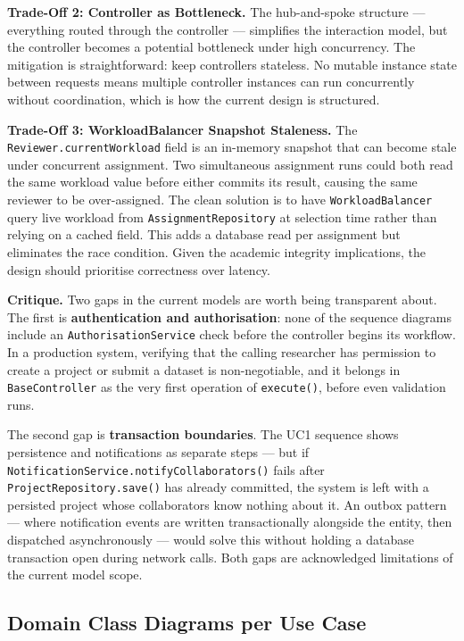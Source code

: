 \documentclass[12pt,a4paper]{article}
\newcommand{\code}[1]{\texttt{\small #1}}
\begin{document}
\noindent\textbf{Trade-Off 2: Controller as Bottleneck.}
The hub-and-spoke structure --- everything routed through the controller --- simplifies the interaction model, but the controller becomes a potential bottleneck under high concurrency. The mitigation is straightforward: keep controllers stateless. No mutable instance state between requests means multiple controller instances can run concurrently without coordination, which is how the current design is structured.

\noindent\textbf{Trade-Off 3: WorkloadBalancer Snapshot Staleness.}
The \code{Reviewer.currentWorkload} field is an in-memory snapshot that can become stale under concurrent assignment. Two simultaneous assignment runs could both read the same workload value before either commits its result, causing the same reviewer to be over-assigned. The clean solution is to have \code{WorkloadBalancer} query live workload from \code{AssignmentRepository} at selection time rather than relying on a cached field. This adds a database read per assignment but eliminates the race condition. Given the academic integrity implications, the design should prioritise correctness over latency.

\noindent\textbf{Critique.}
Two gaps in the current models are worth being transparent about. The first is \textbf{authentication and authorisation}: none of the sequence diagrams include an \code{AuthorisationService} check before the controller begins its workflow. In a production system, verifying that the calling researcher has permission to create a project or submit a dataset is non-negotiable, and it belongs in \code{BaseController} as the very first operation of \code{execute()}, before even validation runs.

The second gap is \textbf{transaction boundaries}. The UC1 sequence shows persistence and notifications as separate steps --- but if \code{NotificationService.notifyCollaborators()} fails after \code{ProjectRepository.save()} has already committed, the system is left with a persisted project whose collaborators know nothing about it. An outbox pattern --- where notification events are written transactionally alongside the entity, then dispatched asynchronously --- would solve this without holding a database transaction open during network calls. Both gaps are acknowledged limitations of the current model scope.

\subsection{Domain Class Diagrams per Use Case}
\end{document}
